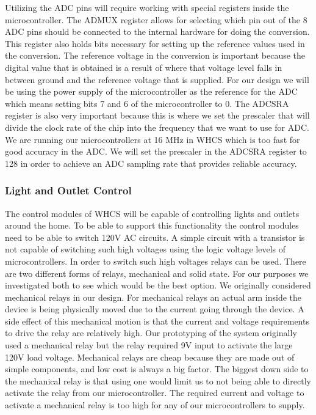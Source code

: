 Utilizing the ADC pins will require working with special registers inside the
microcontroller. The ADMUX register allows for selecting which pin out of the 8
ADC pins should be connected to the internal hardware for doing the conversion.
This register also holds bits necessary for setting up the reference values
used in the conversion. The reference voltage in the conversion is important
because the digital value that is obtained is a result of where that voltage
level falls in between ground and the reference voltage that is supplied. For
our design we will be using the power supply of the microcontroller as the
reference for the ADC which means setting bits 7 and 6 of the microcontroller
to 0. The ADCSRA register is also very important because this is where we set
the prescaler that will divide the clock rate of the chip into the frequency
that we want to use for ADC. We are running our microcontrollers at 16 MHz in
WHCS which is too fast for good accuracy in the ADC. We will set the prescaler
in the ADCSRA register to 128 in order to achieve an ADC sampling rate that
provides reliable accuracy.

\subsubsection{Light and Outlet Control}
The control modules of WHCS will be capable of controlling lights and outlets
around the home. To be able to support this functionality the control modules
need to be able to switch 120V AC circuits. A simple circuit with a transistor
is not capable of switching such high voltages using the logic voltage levels
of microcontrollers. In order to switch such high voltages relays can be used.
There are two different forms of relays, mechanical and solid state. For our
purposes we investigated both to see which would be the best option. We
originally considered mechanical relays in our design. For mechanical relays an
actual arm inside the device is being physically moved due to the current going
through the device. A side effect of this mechanical motion is that the current
and voltage requirements to drive the relay are relatively high. Our
prototyping of the system originally used a mechanical relay but the relay
required 9V input to activate the large 120V load voltage. Mechanical relays
are cheap because they are made out of simple components, and low cost is
always a big factor. The biggest down side to the mechanical relay is that
using one would limit us to not being able to directly activate the relay from
our microcontroller. The required current and voltage to activate a mechanical
relay is too high for any of our microcontrollers to supply.

